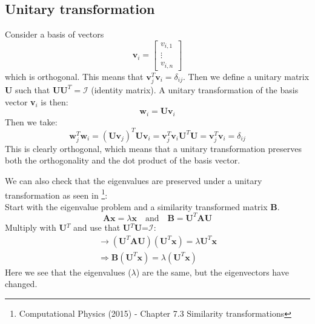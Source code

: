\documentclass[12pt,a4paper,english]{article}
\begin{document}
\subsection{Unitary transformation}
\label{sect_unitary_transf}
Consider a basis of vectors 
\[\textbf{v}_i = \begin{bmatrix}
v_{i,1}\\
\vdots\\
v_{i,n}
\end{bmatrix}\]
which is orthogonal. This means that $\textbf{v}_j^T\textbf{v}_i=\delta_{ij}$. Then we define a unitary matrix $\textbf{U}$ such that $\textbf{U}\textbf{U}^T=\mathcal{I}$ (identity matrix). A unitary transformation of the basis vector \textbf{v}$_i$ is then:
\begin{equation*}
\textbf{w}_i=\textbf{U}\textbf{v}_i
\end{equation*}
Then we take:
\begin{equation*}
\textbf{w}^T_j\textbf{w}_i=(\textbf{U}\textbf{v}_j)^T\textbf{U}\textbf{v}_i=\textbf{v}_j^T\textbf{v}_i\textbf{U}^T\textbf{U}=\textbf{v}_j^T\textbf{v}_i=\delta_{ij}
\end{equation*}
This is clearly orthogonal, which means that a unitary transformation preserves both the orthogonality and the dot product of the basis vector.

We can also check that the eigenvalues are preserved under a unitary transformation as seen in \citet{lectures}\footnote{Computational Physics (2015) - Chapter 7.3 Similarity transformations}:\\
Start with the eigenvalue problem and a similarity transformed matrix \textbf{B}. 
\begin{equation}
\label{eq:sim_transf}
\textbf{Ax}=\lambda\textbf{x}\quad \text{and}\quad \textbf{B}=\textbf{U}^T\textbf{A}\textbf{U}
\end{equation}
Multiply with \textbf{U}$^T$ and use that \textbf{U}$^T$\textbf{U}=$\mathcal{I}$:
\begin{align*}
\rightarrow (\textbf{U}^T\textbf{A}\textbf{U})(\textbf{U}^T\textbf{x})=\lambda\textbf{U}^T\textbf{x}\\
\Rightarrow \textbf{B}(\textbf{U}^T\textbf{x})=\lambda(\textbf{U}^T\textbf{x})
\end{align*}
Here we see that the eigenvalues ($\lambda$) are the same, but the eigenvectors have changed.
\end{document}
